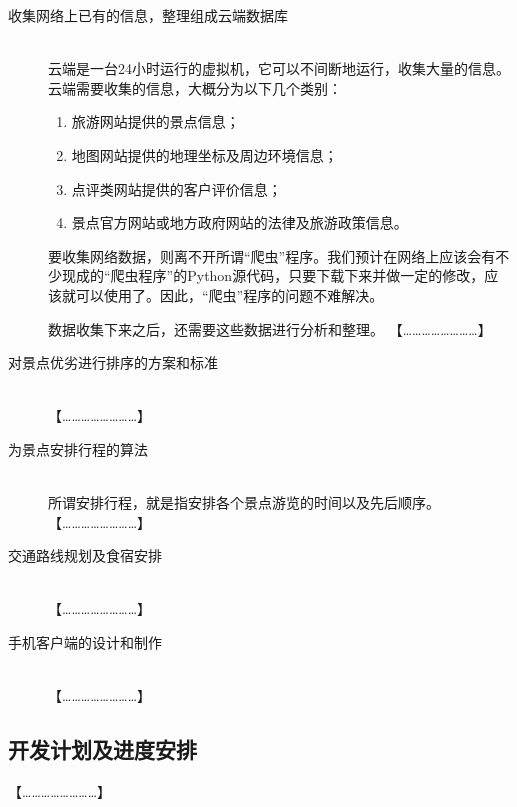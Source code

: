 \documentclass[12pt,a4paper]{article}
\begin{document}
\begin{CJK}{UTF8}{gbsn}
	\begin{description}
	\item[收集网络上已有的信息，整理组成云端数据库] \hfill \\
	云端是一台24小时运行的虚拟机，它可以不间断地运行，收集大量的信息。云端需要收集的信息，大概分为以下几个类别：
		\begin{enumerate}
		\item	旅游网站提供的景点信息；
		\item	地图网站提供的地理坐标及周边环境信息；
		\item	点评类网站提供的客户评价信息；
		\item	景点官方网站或地方政府网站的法律及旅游政策信息。
		\end{enumerate}
	
	要收集网络数据，则离不开所谓“爬虫”程序。我们预计在网络上应该会有不少现成的“爬虫程序”的Python源代码，只要下载下来并做一定的修改，应该就可以使用了。因此，“爬虫”程序的问题不难解决。

	数据收集下来之后，还需要这些数据进行分析和整理。{\color{red} 【……………………】}
	
	\item[对景点优劣进行排序的方案和标准] \hfill \\
	{\color{red} 【……………………】}

	\item[为景点安排行程的算法] \hfill \\
	所谓安排行程，就是指安排各个景点游览的时间以及先后顺序。{\color{red} 【……………………】}

	\item[交通路线规划及食宿安排] \hfill \\
	{\color{red} 【……………………】}

	\item[手机客户端的设计和制作] \hfill \\
	{\color{red} 【……………………】}

	\end{description}
	

	\subsection{开发计划及进度安排}
	{\color{red} 【……………………】}


\end{CJK}
\end{document}
